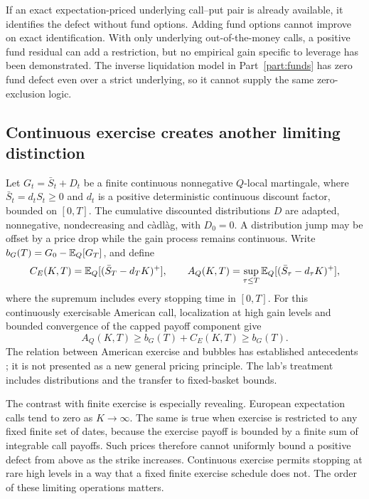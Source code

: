 If an exact expectation-priced underlying call--put pair is already
available, it identifies the defect without fund options. Adding fund
options cannot improve on exact identification. With only underlying
out-of-the-money calls, a positive fund residual can add a restriction,
but no empirical gain specific to leverage has been demonstrated. The
inverse liquidation model in Part~\ref{part:funds} has zero fund defect
even over a strict underlying, so it cannot supply the same zero-exclusion
logic.

\subsection{Continuous exercise creates another limiting distinction}
Let $G_t=\bar S_t+D_t$ be a finite continuous nonnegative
$Q$-local martingale, where $\bar S_t=d_tS_t\geq0$ and $d_t$ is a
positive deterministic continuous discount factor, bounded on $[0,T]$.
The cumulative discounted distributions $D$ are adapted, nonnegative,
nondecreasing and c\`adl\`ag, with $D_0=0$. A distribution jump may be
offset by a price drop while the gain process remains continuous. Write
$b_G(T)=G_0-\mathbb{E}_Q[G_T]$, and define
\[
 C_E(K,T)=\mathbb{E}_Q[(\bar S_T-d_TK)^+],\qquad
 A_Q(K,T)=\sup_{\tau\leq T}\mathbb{E}_Q[(\bar S_\tau-d_\tau K)^+],
\]
where the supremum includes every stopping time in $[0,T]$.
For this continuously exercisable American call,
localization at high gain levels and bounded convergence of the capped
payoff component give
\begin{equation}\label{eq:american}
 A_Q(K,T)\geq b_G(T)+C_E(K,T)\geq b_G(T).
\end{equation}
The relation between American exercise and bubbles has established
antecedents \cite{bayraktar2011strict}; it is not presented as a new
general pricing principle. The lab's treatment includes distributions
and the transfer to fixed-basket bounds.

The contrast with finite exercise is especially revealing. European
expectation calls tend to zero as $K\to\infty$. The same is true when
exercise is restricted to any fixed finite set of dates, because the
exercise payoff is bounded by a finite sum of integrable call payoffs.
Such prices therefore cannot uniformly bound a positive defect from
above as the strike increases. Continuous exercise permits stopping at
rare high levels in a way that a fixed finite exercise schedule does not.
The order of these limiting operations matters.


